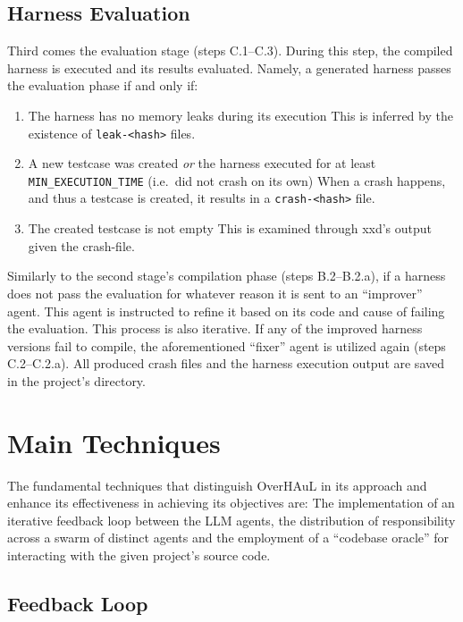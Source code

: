 \documentclass[
  a4paper,
]{scrreprt}
\providecommand{\tightlist}{%
  \setlength{\itemsep}{0pt}\setlength{\parskip}{0pt}}
\theoremstyle{definition}
\theoremstyle{remark}
\begin{document}
\subsection{Harness Evaluation}\label{sec-evaluation}

Third comes the evaluation stage (steps C.1--C.3). During this step, the
compiled harness is executed and its results evaluated. Namely, a
generated harness passes the evaluation phase if and only if:

\begin{enumerate}
\def\labelenumi{\arabic{enumi}.}
\tightlist
\item
  The harness has no memory leaks during its execution This is inferred
  by the existence of \texttt{leak-\textless{}hash\textgreater{}} files.
\item
  A new testcase was created \emph{or} the harness executed for at least
  \texttt{MIN\_EXECUTION\_TIME} (i.e.~did not crash on its own) When a
  crash happens, and thus a testcase is created, it results in a
  \texttt{crash-\textless{}hash\textgreater{}} file.
\item
  The created testcase is not empty This is examined through xxd's
  output given the crash-file.
\end{enumerate}

Similarly to the second stage's compilation phase (steps B.2--B.2.a), if
a harness does not pass the evaluation for whatever reason it is sent to
an ``improver'' agent. This agent is instructed to refine it based on
its code and cause of failing the evaluation. This process is also
iterative. If any of the improved harness versions fail to compile, the
aforementioned ``fixer'' agent is utilized again (steps C.2--C.2.a). All
produced crash files and the harness execution output are saved in the
project's directory.

\section{Main Techniques}\label{sec-techniques}

The fundamental techniques that distinguish OverHAuL in its approach and
enhance its effectiveness in achieving its objectives are: The
implementation of an iterative feedback loop between the LLM agents, the
distribution of responsibility across a swarm of distinct agents and the
employment of a ``codebase oracle'' for interacting with the given
project's source code.

\subsection{Feedback Loop}\label{sec-loop}
\end{document}

